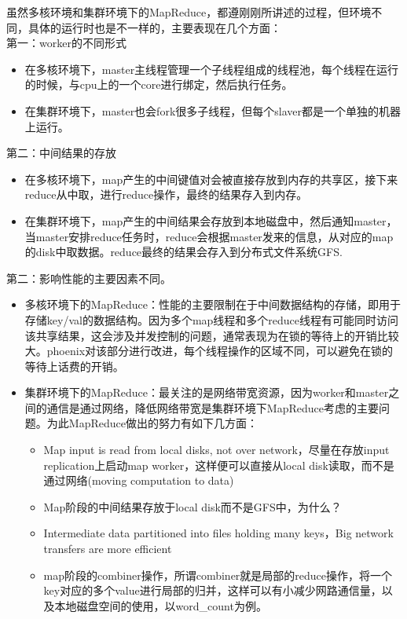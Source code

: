 虽然多核环境和集群环境下的MapReduce，都遵刚刚所讲述的过程，但环境不同，具体的运行时也是不一样的，主要表现在几个方面：
\\
第一：worker的不同形式
\begin{itemize}
  \item 在多核环境下，master主线程管理一个子线程组成的线程池，每个线程在运行的时候，与cpu上的一个core进行绑定，然后执行任务。
  \item 在集群环境下，master也会fork很多子线程，但每个slaver都是一个单独的机器上运行。
\end{itemize}

第二：中间结果的存放
\begin{itemize}
  \item 在多核环境下，map产生的中间键值对会被直接存放到内存的共享区，接下来reduce从中取，进行reduce操作，最终的结果存入到内存。
  \item 在集群环境下，map产生的中间结果会存放到本地磁盘中，然后通知master，当master安排reduce任务时，reduce会根据master发来的信息，从对应的map的disk中取数据。reduce最终的结果会存入到分布式文件系统GFS.
\end{itemize}


第二：影响性能的主要因素不同。
\begin{itemize}
  \item 多核环境下的MapReduce：性能的主要限制在于中间数据结构的存储，即用于存储key/val的数据结构。因为多个map线程和多个reduce线程有可能同时访问该共享结果，这会涉及并发控制的问题，通常表现为在锁的等待上的开销比较大。phoenix对该部分进行改进，每个线程操作的区域不同，可以避免在锁的等待上话费的开销。
  \item 集群环境下的MapReduce：最关注的是网络带宽资源，因为worker和master之间的通信是通过网络，降低网络带宽是集群环境下MapReduce考虑的主要问题。为此MapReduce做出的努力有如下几方面：
  
\begin{itemize}
  \item Map input is read from local disks, not over network，尽量在存放input replication上启动map worker，这样便可以直接从local disk读取，而不是通过网络(moving computation to data)
  \item Map阶段的中间结果存放于local disk而不是GFS中，为什么？
  \item Intermediate data partitioned into files holding many keys，Big network transfers are more efficient
  \item map阶段的combiner操作，所谓combiner就是局部的reduce操作，将一个key对应的多个value进行局部的归并，这样可以有小减少网路通信量，以及本地磁盘空间的使用，以word\_count为例。
\end{itemize}
  
\end{itemize}


